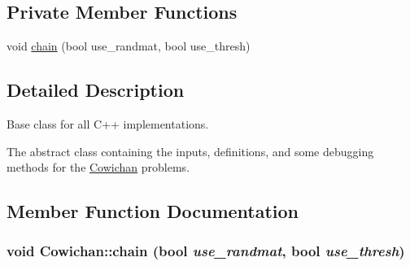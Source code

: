 \subsection*{Private Member Functions}
\begin{CompactItemize}
\item 
void \hyperlink{class_cowichan_08ee88eb612571e8faa20b2645dc906d}{chain} (bool use\_\-randmat, bool use\_\-thresh)
\end{CompactItemize}


\subsection{Detailed Description}
Base class for all C++ implementations. 

The abstract class containing the inputs, definitions, and some debugging methods for the \hyperlink{class_cowichan}{Cowichan} problems. 

\subsection{Member Function Documentation}
\hypertarget{class_cowichan_08ee88eb612571e8faa20b2645dc906d}{
\subsubsection[{chain}]{\setlength{\rightskip}{0pt plus 5cm}void Cowichan::chain (bool {\em use\_\-randmat}, \/  bool {\em use\_\-thresh})}}
\label{class_cowichan_08ee88eb612571e8faa20b2645dc906d}


